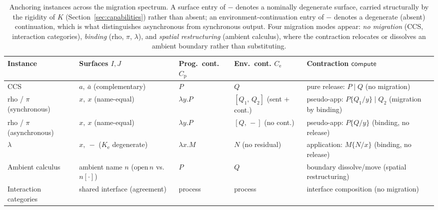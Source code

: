 \documentclass[11pt]{article}
\theoremstyle{definition}
\theoremstyle{plain}
\newcommand{\compute}{\mathsf{compute}}
\newcommand{\Ke}{K_{\mathrm{e}}}
\begin{document}
\begin{table}[h]
\centering
\renewcommand{\arraystretch}{1.5}
\setlength{\tabcolsep}{6pt}
\begin{tabular}{@{}>{\raggedright\arraybackslash}p{2.3cm}
                  >{\centering\arraybackslash}p{1.9cm}
                  >{\centering\arraybackslash}p{1.9cm}
                  >{\centering\arraybackslash}p{2.0cm}
                  >{\raggedright\arraybackslash}p{4.2cm}@{}}
\toprule
\textbf{Instance} & \textbf{Surfaces} $I, J$ & \textbf{Prog.\ cont.}
  $C_{\mathrm p}$ & \textbf{Env.\ cont.} $C_{\mathrm e}$ &
  \textbf{Contraction} $\compute$ \\
\midrule
CCS
  & $a,\ \bar a$ \newline (complementary)
  & $P$
  & $Q$
  & pure release: $P \mathbin{|} Q$ \quad(no migration) \\
rho / $\pi$ \newline (synchronous)
  & $x,\ x$ \newline (name-equal)
  & $\lambda y.P$
  & $[Q_1,\,Q_2]$ \newline (sent + cont.)
  & pseudo-app: $P\{Q_1/y\} \mathbin{|} Q_2$ \quad(migration by binding) \\
rho / $\pi$ \newline (asynchronous)
  & $x,\ x$ \newline (name-equal)
  & $\lambda y.P$
  & $[Q,\,{-}]$ \newline (no cont.)
  & pseudo-app: $P\{Q/y\}$ \quad(binding, no release) \\
$\lambda$
  & $x,\ {-}$ \newline ($\Ke$ degenerate)
  & $\lambda x.M$
  & $N$ \newline (no residual)
  & application: $M\{N/x\}$ \quad(binding, no release) \\
Ambient \newline calculus
  & ambient name $n$ \newline ($\mathrm{open}\,n$ vs.\ $n[\cdot]$)
  & $P$
  & $Q$
  & boundary dissolve/move \quad(spatial restructuring) \\
Interaction \newline categories
  & shared interface \newline (agreement)
  & process
  & process
  & interface composition \quad(no migration) \\
\bottomrule
\end{tabular}
\caption{Anchoring instances across the migration spectrum. A surface
entry of ${-}$ denotes a nominally degenerate surface, carried
structurally by the rigidity of $K$ (Section~\ref{sec:capabilities})
rather than absent; an environment-continuation entry of ${-}$ denotes a
degenerate (absent) continuation, which is what distinguishes asynchronous
from synchronous output. Four migration modes appear: \emph{no migration}
(CCS, interaction categories), \emph{binding} (rho, $\pi$, $\lambda$),
and \emph{spatial restructuring} (ambient calculus), where the contraction
relocates or dissolves an ambient boundary rather than substituting.}
\label{tab:spectrum}
\end{table}
\end{document}
